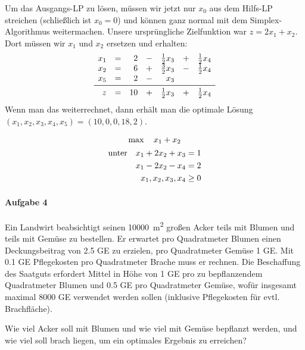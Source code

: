 \documentclass[
a4paper, %
11pt,
]
{scrartcl}
\begin{document}
Um das Ausgangs-LP zu lösen, müssen wir jetzt nur $x_0$ aus dem Hilfs-LP
streichen (schließlich ist $x_0 = 0$) und können ganz normal mit dem
Simplex-Algorithmus weitermachen. Unsere ursprüngliche Zielfunktion war $z = 2
x_1 + x_2$. Dort müssen wir $x_1$ und $x_2$ ersetzen und erhalten:
\begin{align*}
  \begin{array}{rcrcrcrcrclr}
    x_1      & = & 2  & - & \frac{1}{2} x_3 & + & \frac{1}{2} x_4\\
    x_2      & = & 6  & + & \frac{3}{2} x_3 & - & \frac{1}{2} x_4\\
    x_5      & = & 2  & - & x_3             &   & \\
    \midrule
    z        & = & 10 & + & \frac{1}{2} x_3 & + & \frac{1}{2} x_4
  \end{array}
\end{align*}
Wenn man das weiterrechnet, dann erhält man die optimale Lösung $(x_1, x_2, x_3,
x_4, x_5) = (10, 0, 0, 18, 2)$.

\begin{equation}
  \begin{gathered}
    \max \quad x_1 + x_2\\
    \begin{aligned}
      \textup{unter}
      \quad
      x_1 + 2x_2 + x_3   & = 1\\
      x_1 - 2x_2 - x_4   & = 2\\
      x_1, x_2, x_3, x_4 & \geq 0
    \end{aligned}
  \end{gathered}
\end{equation}

\paragraph{Aufgabe 4}%
\label{par:aufgabe_4}

Ein Landwirt beabsichtigt seinen \SI{10000}{m^2} großen Acker teils mit Blumen
und teils mit Gemüse zu bestellen. Er erwartet pro Quadratmeter Blumen einen
Deckungsbeitrag von \num{2,5} GE zu erzielen, pro Quadratmeter Gemüse \num{1}
GE\@. Mit \num{0,1} GE Pflegekosten pro Quadratmeter Brache muss er rechnen. Die
Beschaffung des Saatguts erfordert Mittel in Höhe von \num{1} GE pro zu
bepflanzendem Quadratmeter Blumen und \num{0,5} GE pro Quadratmeter Gemüse,
wofür insgesamt maximal \num{8000} GE verwendet werden sollen (inklusive
Pflegekosten für evtl. Brachfläche).

Wie viel Acker soll mit Blumen und wie viel mit Gemüse bepflanzt werden, und wie
viel soll brach liegen, um ein optimales Ergebnis zu erreichen?
\end{document}
